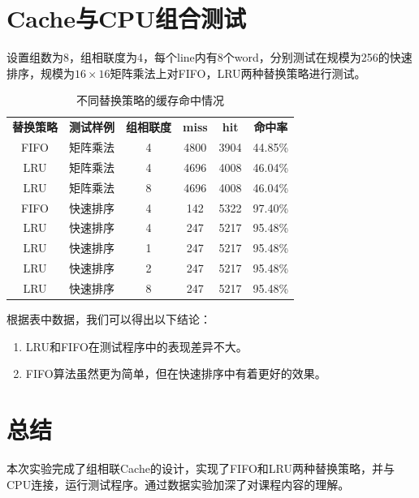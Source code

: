 \documentclass{ctexart}
\begin{document}
\section{\hei Cache与CPU组合测试}
设置组数为8，组相联度为4，每个line内有8个word，分别测试在规模为256的快速排序，规模为$16\times 16$矩阵乘法上对FIFO，LRU两种替换策略进行测试。
\begin{table}[H]
    \centering
    \begin{tabular}{cccccc}
        \textbf{替换策略} & \textbf{测试样例} & \textbf{组相联度} & \textbf{miss} & \textbf{hit} & \textbf{命中率} \\
        FIFO              & 矩阵乘法          & 4                 & 4800          & 3904         & 44.85\%         \\
        LRU               & 矩阵乘法          & 4                 & 4696          & 4008         & 46.04\%         \\
        LRU               & 矩阵乘法          & 8                 & 4696          & 4008         & 46.04\%         \\
        FIFO              & 快速排序          & 4                 & 142           & 5322         & 97.40\%         \\
        LRU               & 快速排序          & 4                 & 247           & 5217         & 95.48\%         \\
        LRU               & 快速排序          & 1                 & 247           & 5217         & 95.48\%         \\
        LRU               & 快速排序          & 2                 & 247           & 5217         & 95.48\%         \\
        LRU               & 快速排序          & 8                 & 247           & 5217         & 95.48\%
    \end{tabular}
    \caption{不同替换策略的缓存命中情况}
    \par 根据表中数据，我们可以得出以下结论：
    \begin{enumerate}
        \item LRU和FIFO在测试程序中的表现差异不大。
        \item FIFO算法虽然更为简单，但在快速排序中有着更好的效果。
    \end{enumerate}
\end{table}
\section{\hei 总结}
本次实验完成了组相联Cache的设计，实现了FIFO和LRU两种替换策略，并与CPU连接，运行测试程序。通过数据实验加深了对课程内容的理解。
\end{document}
